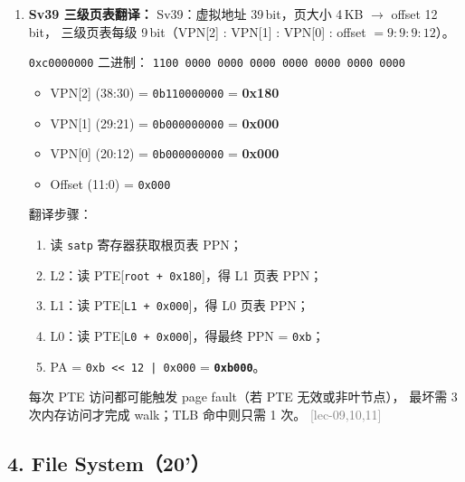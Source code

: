 \documentclass[11pt,a4paper]{article}
\newcommand{\lec}[1]{\textcolor{gray}{[lec-#1]}}
\begin{document}
\begin{enumerate}[label=(\arabic*),leftmargin=*]
  \item \textbf{Sv39 三级页表翻译：} \newline
        Sv39：虚拟地址 39\,bit，页大小 4\,KB $\to$ offset 12\,bit，
        三级页表每级 9\,bit（VPN[2] : VPN[1] : VPN[0] : offset
        $= 9:9:9:12$）。

        \texttt{0xc0000000} 二进制：
        \texttt{1100\,0000\,0000\,0000\,0000\,0000\,0000\,0000}

        \begin{itemize}[nosep]
          \item VPN[2] (38:30) = \texttt{0b110000000} = \textbf{0x180}
          \item VPN[1] (29:21) = \texttt{0b000000000} = \textbf{0x000}
          \item VPN[0] (20:12) = \texttt{0b000000000} = \textbf{0x000}
          \item Offset (11:0) = \texttt{0x000}
        \end{itemize}

        翻译步骤：
        \begin{enumerate}[nosep]
          \item 读 \texttt{satp} 寄存器获取根页表 PPN；
          \item L2：读 PTE[\texttt{root + 0x180}]，得 L1 页表 PPN；
          \item L1：读 PTE[\texttt{L1 + 0x000}]，得 L0 页表 PPN；
          \item L0：读 PTE[\texttt{L0 + 0x000}]，得最终 PPN = \texttt{0xb}；
          \item PA = \texttt{0xb << 12 | 0x000} = \textbf{\texttt{0xb000}}。
        \end{enumerate}

        每次 PTE 访问都可能触发 page fault（若 PTE 无效或非叶节点），
        最坏需 3 次内存访问才完成 walk；TLB 命中则只需 1 次。 \lec{09,10,11}

\end{enumerate}

\subsection*{4. File System（20'）}
\end{document}
